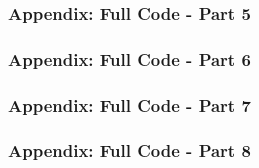 \documentclass[aspectratio=169, 8pt]{beamer}
\begin{document}
	\begin{frame}[fragile, shrink=10]
		\frametitle{Appendix: Full Code - Part 5}
		
	\end{frame}

	\begin{frame}[fragile, shrink=10]
		\frametitle{Appendix: Full Code - Part 6}
		
	\end{frame}

	\begin{frame}[fragile, shrink=10]
		\frametitle{Appendix: Full Code - Part 7}
		
	\end{frame}

	\begin{frame}[fragile, shrink=10]
		\frametitle{Appendix: Full Code - Part 8}
		
	\end{frame}
\end{document}
